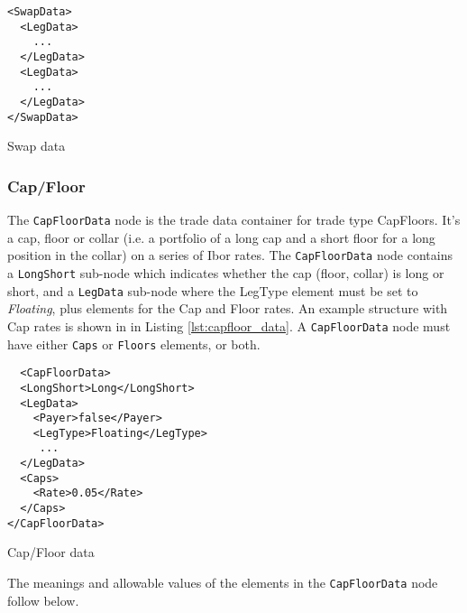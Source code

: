 \begin{listing}[H]
\begin{verbatim}
<SwapData>
  <LegData>
    ...
  </LegData>
  <LegData>
    ...
  </LegData>
</SwapData>
\end{verbatim}
\caption{Swap data}
\label{lst:swap_data}
\end{listing}

\subsubsection{Cap/Floor}

The \lstinline!CapFloorData! node is the trade data container for trade type CapFloors.  It's a cap, floor or collar
(i.e. a portfolio of a long cap and a short floor for a long position in the collar) on a series of Ibor rates. The
\lstinline!CapFloorData! node contains a \lstinline!LongShort! sub-node which indicates whether the cap (floor, collar)
is long or short, and a \lstinline!LegData!  sub-node where the LegType element must be set to \emph{Floating}, plus
elements for the Cap and Floor rates. An example structure with Cap rates is shown in in Listing
\ref{lst:capfloor_data}. A \lstinline!CapFloorData! node must have either \lstinline!Caps! or \lstinline!Floors!
elements, or both.

\begin{listing}[H]
\begin{verbatim}
  <CapFloorData>
  <LongShort>Long</LongShort>
  <LegData>
    <Payer>false</Payer>
    <LegType>Floating</LegType>
     ...
  </LegData>
  <Caps>
    <Rate>0.05</Rate>
  </Caps>
</CapFloorData>
\end{verbatim}
\caption{Cap/Floor data}
\label{lst:capfloor_data}
\end{listing}

The meanings and allowable values of the elements in the \lstinline!CapFloorData!  node follow below.

